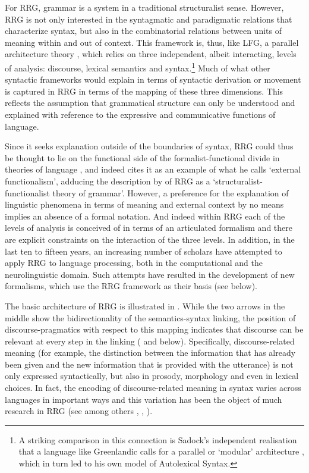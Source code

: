 \documentclass[output=paper,hidelinks]{langscibook}
\begin{document}
For RRG, grammar is a system in a traditional structuralist sense. However, RRG is not only interested in the syntagmatic and paradigmatic relations that characterize syntax, but also in the combinatorial relations between units of meaning within and out of context. This framework is, thus, like LFG, a parallel architecture theory \citep[Chapter~5]{jackendoff2002foundations}, which relies on three independent, albeit interacting, levels of analysis: discourse, lexical semantics and syntax.\footnote{A striking comparison in this connection is Sadock's independent realisation that a language like Greenlandic calls for a parallel or `modular' architecture \citep[ix--xi]{Sadock91}, which in turn led to his own model of Autolexical Syntax.} Much of what other syntactic frameworks would explain in terms of syntactic derivation or movement is captured in RRG in terms of the mapping of these three dimensions. This reflects the assumption that grammatical structure can only be understood and explained with reference to the expressive and communicative functions of language.

  Since it seeks explanation outside of the boundaries of syntax, RRG could thus be thought to lie on the functional side of the formalist-functional divide in theories of language \citep{Butler2005,Butler2005b,Mairal2012}, and indeed \citet[14-16]{Newmeyer1998} cites it as an example of what he calls `external functionalism', adducing the description by \citet[1]{VanValin1993} of RRG as a `structuralist-functionalist theory of grammar'. However, a preference for the explanation of linguistic phenomena in terms of meaning and external context by no means implies an absence of a formal notation. And indeed within RRG each of the levels of analysis is conceived of in terms of an articulated formalism and there are explicit constraints on the interaction of the three levels. In addition, in the last ten to fifteen years, an increasing number of scholars have attempted to apply RRG to language processing, both in the computational and the neurolinguistic domain. Such attempts have resulted in the development of new formalisms, which use the RRG framework as their basis (see  below).

  The basic architecture of RRG is illustrated in . While the two arrows in the middle show the bidirectionality of the semantics-syntax linking, the position of discourse-pragmatics with respect to this mapping indicates that discourse can be relevant at every step in the linking (\citealt{Bentley2022a} and  below). Specifically, discourse-related meaning (for example, the distinction between the information that has already been given and the new information that is provided with the utterance) is not only expressed syntactically, but also in prosody, morphology and even in lexical choices. In fact, the encoding of discourse-related meaning in syntax varies across languages in important ways and this variation has been the object of much research in RRG (see among others \citealt{VanValin1999}, \citealt{Shimojo1995,Shimojo2008,Shimojo2009,Shimojo2010,Shimojo2011}, \citealt{Bentley2008}).
\end{document}
